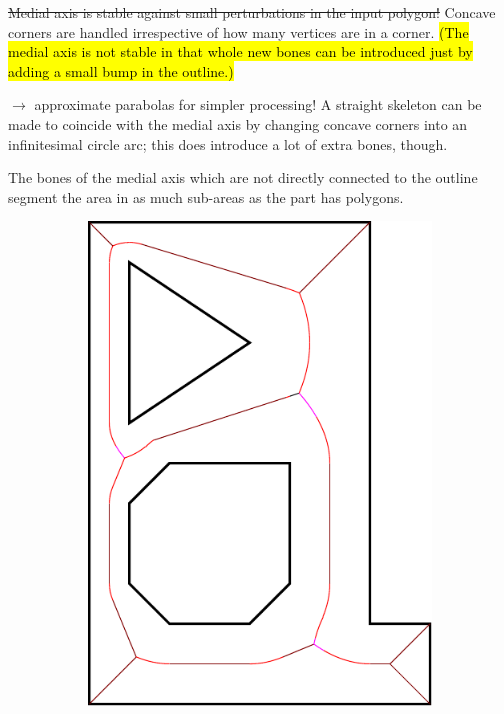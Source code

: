 \st{Medial axis is stable against small perturbations in the input polygon!}
Concave corners are handled irrespective of how many vertices are in a corner.
\hl{(The medial axis is not stable in that whole new bones can be introduced just by adding a small bump in the outline.)}


$\to$ approximate parabolas for simpler processing!
A straight skeleton can be made to coincide with the medial axis by changing concave corners into an infinitesimal circle arc;
this does introduce a lot of extra bones, though.


The bones of the medial axis which are not directly connected to the outline segment the area in as much sub-areas as the part has polygons.


\begin{figure}
\begin{subfigure}{0.3\columnwidth}
\includegraphics[width=\columnwidth]{sources/method/MAT_example.pdf}

\end{subfigure}
\end{figure}

